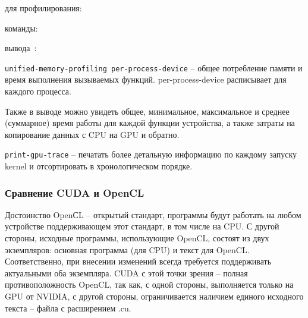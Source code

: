  для профилирования:

 команды:

 вывода~\cite{Rutsh2011}: \\
\noindent{}

\texttt{{\textendash\textendash}unified-memory-profiling per-process-device} -- общее потребление памяти и время выполнения вызываемых функций. per-process-device расписывает для каждого процесса.

Также в выводе можно увидеть общее, минимальное, максимальное и среднее (суммарное) время работы для каждой функции устройства, а также затраты на копирование данных с CPU на GPU и обратно.

\texttt{{\textendash\textendash}print-gpu-trace} -- печатать более детальную информацию по каждому запуску kernel и отсортировать в хронологическом порядке.

\subsubsection*{Сравнение CUDA и OpenCL}
Достоинство OpenСL -- открытый стандарт, программы будут работать на любом устройстве поддерживающем этот стандарт, в том числе на CPU. С другой стороны, исходные программы, использующие OpenCL, состоят из двух экземпляров: основная программа (для CPU) и текст для OpenCL. Соответственно, при внесении изменений всегда требуется поддерживать актуальными оба экземпляра. CUDA с этой точки зрения -- полная противоположность OpenCL, так как, с одной стороны, выполняется только на GPU от NVIDIA, с другой стороны, ограничивается наличием единого исходного текста -- файла с расширением .cu.

